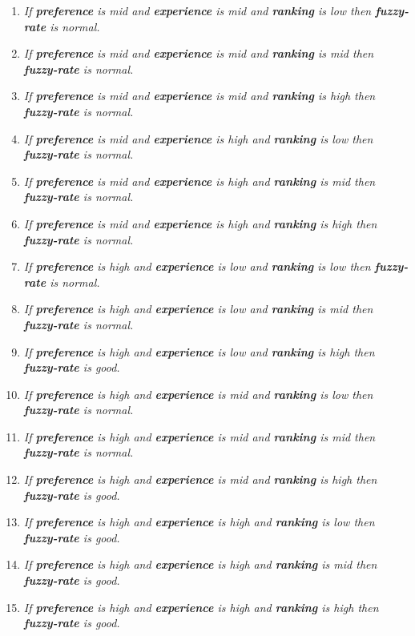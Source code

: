 \begin{enumerate}
	\item \textit{If \textbf{preference} is mid and
		\textbf{experience} is mid and \textbf{ranking} is low then \textbf{fuzzy-rate} is normal.}
	\item \textit{If \textbf{preference} is mid and
		\textbf{experience} is mid and \textbf{ranking} is mid then \textbf{fuzzy-rate} is normal.}
	\item \textit{If \textbf{preference} is mid and
		\textbf{experience} is mid and \textbf{ranking} is high then \textbf{fuzzy-rate} is normal.}
	\item \textit{If \textbf{preference} is mid and
		\textbf{experience} is high and \textbf{ranking} is low then \textbf{fuzzy-rate} is normal.}
	\item \textit{If \textbf{preference} is mid and
		\textbf{experience} is high and \textbf{ranking} is mid then \textbf{fuzzy-rate} is normal.}
	\item \textit{If \textbf{preference} is mid and
		\textbf{experience} is high and \textbf{ranking} is high then \textbf{fuzzy-rate} is normal.}
	\item \textit{If \textbf{preference} is high and
		\textbf{experience} is low and \textbf{ranking} is low then \textbf{fuzzy-rate} is normal.}\
	\item \textit{If \textbf{preference} is high and
		\textbf{experience} is low and \textbf{ranking} is mid then \textbf{fuzzy-rate} is normal.}\
	\item \textit{If \textbf{preference} is high and
		\textbf{experience} is low and \textbf{ranking} is high then \textbf{fuzzy-rate} is good.}\
	\item \textit{If \textbf{preference} is high and
		\textbf{experience} is mid and \textbf{ranking} is low then \textbf{fuzzy-rate} is normal.}\
	\item \textit{If \textbf{preference} is high and
		\textbf{experience} is mid and \textbf{ranking} is mid then \textbf{fuzzy-rate} is normal.}\
	\item \textit{If \textbf{preference} is high and
		\textbf{experience} is mid and \textbf{ranking} is high then \textbf{fuzzy-rate} is good.}\
	\item \textit{If \textbf{preference} is high and
		\textbf{experience} is high and \textbf{ranking} is low then \textbf{fuzzy-rate} is good.}\
	\item \textit{If \textbf{preference} is high and
		\textbf{experience} is high and \textbf{ranking} is mid then \textbf{fuzzy-rate} is good.}\
	\item \textit{If \textbf{preference} is high and
		\textbf{experience} is high and \textbf{ranking} is high then \textbf{fuzzy-rate} is good.}\

\end{enumerate}
